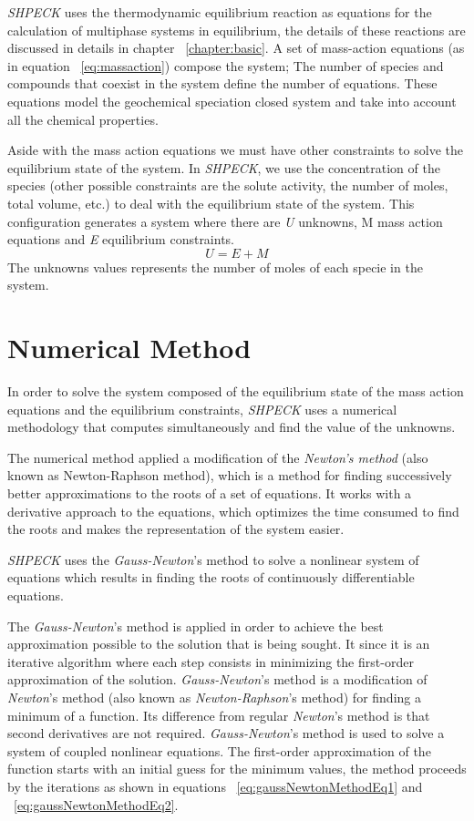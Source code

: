 \documentclass[ppgc,mestrado,english]{iiufrgs}
\begin{document}
\emph{SHPECK} uses the thermodynamic equilibrium reaction as equations for the calculation of multiphase systems in equilibrium, the details of these reactions are discussed in details in chapter ~\ref{chapter:basic}. A set of mass-action equations (as in equation ~\ref{eq:massaction}) compose the system; The number of species and compounds that coexist in the system define the number of equations. These equations model the geochemical speciation closed system and take into account all the chemical properties.

Aside with the mass action equations we must have other constraints to solve the equilibrium state of the system. In \emph{SHPECK}, we use the concentration of the species (other possible constraints are the solute activity, the number of moles, total volume, etc.) to deal with the equilibrium state of the system.
This configuration generates a system where there are \emph{U} unknowns, {M} mass action equations and \emph{E} equilibrium constraints. 
\begin{equation}\label{equilibrium_reaction}
U = E + M
\end{equation}
The unknowns values represents the number of moles of each specie in the system.

\section{Numerical Method}
In order to solve the system composed of the equilibrium state of the mass action equations and the equilibrium constraints, \emph{SHPECK} uses a numerical methodology that computes simultaneously and find the value of the unknowns.


The numerical method applied a modification of the \emph{Newton's method} (also known as Newton-Raphson method), which is a method for finding successively better approximations to the roots of a set of equations. It works with a derivative approach to the equations, which optimizes the time consumed to find the roots and makes the representation of the system easier.

\emph{SHPECK} uses the \emph{Gauss-Newton}'s method to solve a nonlinear system of equations which results in finding the roots of continuously differentiable equations. 

The \emph{Gauss-Newton}'s method is applied in order to achieve the best approximation possible to the solution that is being sought. It since it is an iterative algorithm where each step consists in minimizing the first-order approximation of the solution. \emph{Gauss-Newton}'s method is a modification of \emph{Newton}'s method (also known as \emph{Newton-Raphson}'s method) for finding a minimum of a function. Its difference from regular \emph{Newton}'s method is that second derivatives are not required. \emph{Gauss-Newton}'s method is used to solve a system of coupled nonlinear equations. The first-order approximation of the function starts with an initial guess for the minimum values, the method proceeds by the iterations as shown in equations ~\ref{eq:gaussNewtonMethodEq1} and ~\ref{eq:gaussNewtonMethodEq2}.
\end{document}
